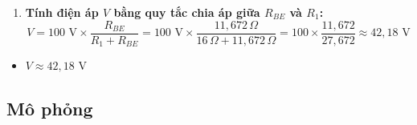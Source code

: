 \begin{enumerate}[leftmargin=2em]
  \item \textbf{Tính điện áp $V$ bằng quy tắc chia áp giữa $R_{BE}$ và $R_1$:}
        \[
        V = 100\text{ V} \times \frac{R_{BE}}{R_1 + R_{BE}} = 100\text{ V} \times \frac{11{,}672\,\Omega}{16\,\Omega + 11{,}672\,\Omega} = 100 \times \frac{11{,}672}{27{,}672} \approx 42{,}18\text{ V}
        \]
\end{enumerate}

\begin{dapsobox}
  \begin{itemize}[leftmargin=1.5em]
    \item $V \approx 42{,}18\text{ V}$
  \end{itemize}
\end{dapsobox}

\subsection{Mô phỏng}
\simresult
{}
